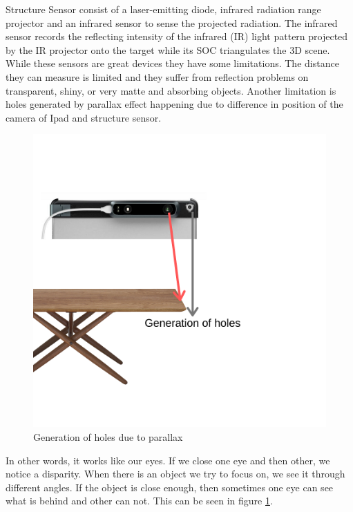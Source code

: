 Structure Sensor consist of a laser-emitting diode, infrared radiation range projector and an infrared sensor to sense the projected radiation. The infrared sensor records the reflecting intensity of the infrared (IR) light pattern projected by the IR projector onto the target while its  SOC triangulates the 3D scene. \cite{Kalantari} While these sensors are great devices they have some limitations. The distance they can measure is limited and they suffer from reflection problems on transparent, shiny, or very matte and absorbing objects. Another limitation is holes generated by parallax effect happening due to difference in position of the camera of Ipad and structure sensor.\\


\begin{figure}[h]
    \centering
    \includegraphics[scale=0.4]{Figures/holes.png}
    \caption{Generation of holes due to parallax}
    \label{fig:holes}
\end{figure}

In other words, it works like our eyes. If we close one eye and then other, we notice a disparity. When there is an object we try to focus on, we see it through different angles. If the object is close enough, then sometimes one eye can see what is behind and other can not. This can be seen in figure \ref{fig:holes}.


